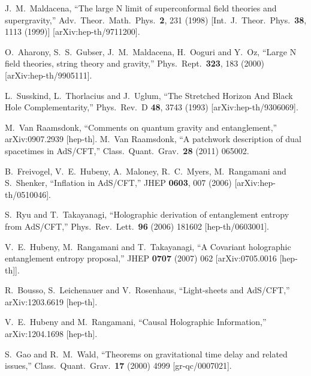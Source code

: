 \documentclass[12pt]{article}
\renewcommand{\(}{\left(}
\renewcommand{\)}{\right)}
\begin{document}
\begin{thebibliography}{999}

  J.~M.~Maldacena,
  ``The large N limit of superconformal field theories and supergravity,''
  Adv.\ Theor.\ Math.\ Phys.\  {\bf 2}, 231 (1998)
  [Int.\ J.\ Theor.\ Phys.\  {\bf 38}, 1113 (1999)]
  [arXiv:hep-th/9711200].

  O.~Aharony, S.~S.~Gubser, J.~M.~Maldacena, H.~Ooguri and Y.~Oz,
  ``Large N field theories, string theory and gravity,''
  Phys.\ Rept.\  {\bf 323}, 183 (2000)
  [arXiv:hep-th/9905111].

  L.~Susskind, L.~Thorlacius and J.~Uglum,
  ``The Stretched Horizon And Black Hole Complementarity,''
  Phys.\ Rev.\  D {\bf 48}, 3743 (1993)
  [arXiv:hep-th/9306069].

  M.~Van Raamsdonk,
  ``Comments on quantum gravity and entanglement,''
  arXiv:0907.2939 [hep-th].
    M.~Van Raamsdonk,
  ``A patchwork description of dual spacetimes in AdS/CFT,''
  Class.\ Quant.\ Grav.\  {\bf 28} (2011) 065002.

  B.~Freivogel, V.~E.~Hubeny, A.~Maloney, R.~C.~Myers, M.~Rangamani and S.~Shenker,
  ``Inflation in AdS/CFT,''
  JHEP {\bf 0603}, 007 (2006)
  [arXiv:hep-th/0510046].

  S.~Ryu and T.~Takayanagi,
  ``Holographic derivation of entanglement entropy from AdS/CFT,''
  Phys.\ Rev.\ Lett.\  {\bf 96} (2006) 181602
  [hep-th/0603001].

  V.~E.~Hubeny, M.~Rangamani and T.~Takayanagi,
  ``A Covariant holographic entanglement entropy proposal,''
  JHEP {\bf 0707} (2007) 062
  [arXiv:0705.0016 [hep-th]].

  R.~Bousso, S.~Leichenauer and V.~Rosenhaus,
  ``Light-sheets and AdS/CFT,''
  arXiv:1203.6619 [hep-th].

  V.~E.~Hubeny and M.~Rangamani,
  ``Causal Holographic Information,''
  arXiv:1204.1698 [hep-th].
  
  S.~Gao and R.~M.~Wald,
  ``Theorems on gravitational time delay and related issues,''
  Class.\ Quant.\ Grav.\  {\bf 17} (2000) 4999
  [gr-qc/0007021].


\end{thebibliography}
\end{document}
